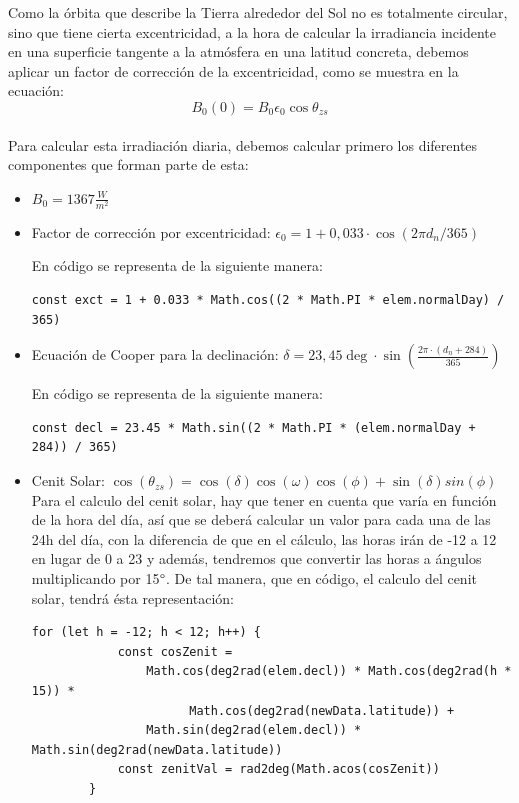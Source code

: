 Como la órbita que describe la Tierra alrededor del Sol no es totalmente circular, sino que tiene cierta excentricidad, a la hora de calcular la irradiancia incidente en una superficie tangente a la atmósfera en una latitud concreta, debemos aplicar un factor de corrección de la excentricidad, como se muestra en la ecuación:\\

\begin{equation}\label{eqn:B00}
B_0(0) = B_0\epsilon_0\cos\theta_{zs}
\end{equation}\\

Para calcular esta irradiación diaria, debemos calcular primero los diferentes componentes que forman parte de esta:
\begin{itemize}
\item $B_{0} = 1367 \frac{W}{m^2}$
\item Factor de corrección por excentricidad: $\epsilon_0 = 1 + 0,033 \cdot \cos(2 \pi d_n / 365)$

En código se representa de la siguiente manera:
\begin{lstlisting}[style=ES6, caption={Factor de corrección por excentricidad}]
		const exct = 1 + 0.033 * Math.cos((2 * Math.PI * elem.normalDay) / 365)
\end{lstlisting}
\item Ecuación de Cooper para la declinación: $\delta = 23,45\deg · \sin(\frac{2\pi·(d_n+284)}{365})$

En código se representa de la siguiente manera:
\begin{lstlisting}[style=ES6, caption={Ecuación de Cooper para declinación}]
		const decl = 23.45 * Math.sin((2 * Math.PI * (elem.normalDay + 284)) / 365)
\end{lstlisting}
\item Cenit Solar: $\cos(\theta_{zs}) = \cos(\delta)\cos(\omega)\cos(\phi) + \sin(\delta)sin(\phi)$\\

Para el calculo del cenit solar, hay que tener en cuenta que varía en función de la hora del día, así que se deberá calcular un valor para cada una de las 24h del día, con la diferencia de que en el cálculo, las horas irán de -12 a 12 en lugar de 0 a 23 y además, tendremos que convertir las horas a ángulos multiplicando por 15$\degree$. De tal manera, que en código, el calculo del cenit solar, tendrá ésta representación:
\newpage
\begin{lstlisting}[style=ES6, caption={Cálculo del cenit solar}]
		for (let h = -12; h < 12; h++) {
			const cosZenit =
				Math.cos(deg2rad(elem.decl)) * Math.cos(deg2rad(h * 15)) * 	
					  Math.cos(deg2rad(newData.latitude)) +
				Math.sin(deg2rad(elem.decl)) * Math.sin(deg2rad(newData.latitude))
			const zenitVal = rad2deg(Math.acos(cosZenit))
		}
\end{lstlisting}
\end{itemize}


